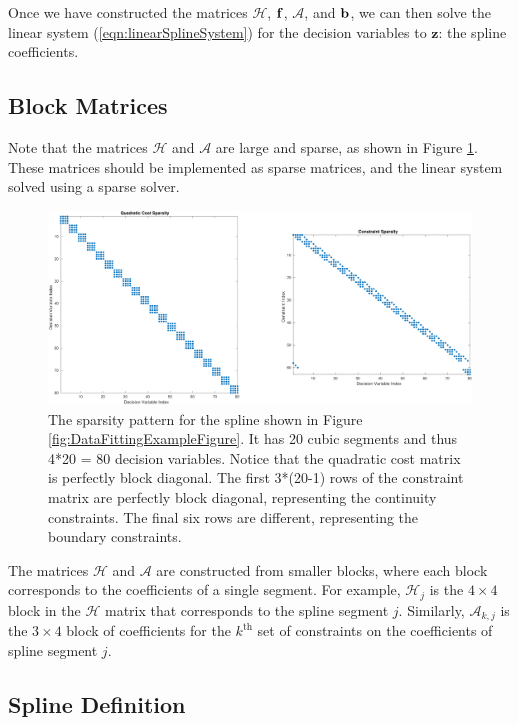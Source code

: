 Once we have constructed the matrices
$\mathcal{H}$,  $\bf{f}$,  $\mathcal{A}$, and $\bf{b}$,
we can then solve the linear system (\ref{eqn:linearSplineSystem})
for the decision variables to $\bm{z}$: the spline coefficients.

\subsection{Block Matrices}

Note that the matrices $\mathcal{H}$ and $\mathcal{A}$ are large and sparse,
as shown in Figure \ref{fig:SparsityPattern}.
These matrices should be implemented as sparse matrices, and the linear system solved using a sparse solver.

\begin{figure}[ht]
	\centering
  \includegraphics[width=\textwidth]{fig/SparsityPattern.pdf}
  \caption{The sparsity pattern for the spline shown in Figure \ref{fig:DataFittingExampleFigure}.
           It has 20 cubic segments and thus 4*20 = 80 decision variables.
           Notice that the quadratic cost matrix is perfectly block diagonal.
           The first 3*(20-1) rows of the constraint matrix are perfectly block diagonal,
             representing the continuity constraints.
           The final six rows are different, representing the boundary constraints.}
  \label{fig:SparsityPattern}
\end{figure}

The matrices $\mathcal{H}$ and $\mathcal{A}$ are constructed from smaller blocks,
where each block corresponds to the coefficients of a single segment. For example,
$\mathcal{H}_j$ is the $4 \times 4$ block in the $\mathcal{H}$ matrix that corresponds to the
spline segment $j$.
Similarly, $\mathcal{A}_{k,j}$ is the $3 \times 4$ block of coefficients
for the $k^\text{th}$ set of constraints on the coefficients of spline segment $j$.

\subsection{Spline Definition}

